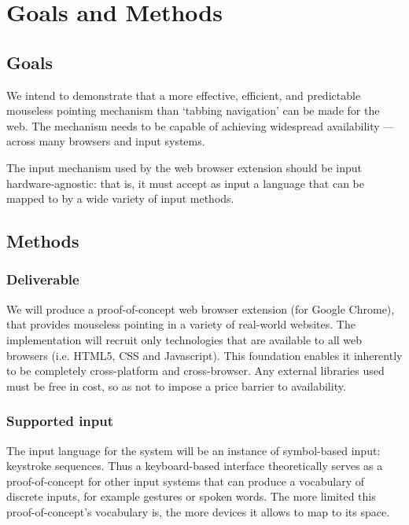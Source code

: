 \documentclass[a4paper, 12pt]{report}
\begin{document}
\section{Goals and Methods}
\subsection{Goals}
We intend to demonstrate that a more effective, efficient, and predictable mouseless pointing mechanism than `tabbing navigation' can be made for the web. The mechanism needs to be capable of achieving widespread availability --- across many browsers and input systems.

The input mechanism used by the web browser extension should be input hardware-agnostic: that is, it must accept as input a language that can be mapped to by a wide variety of input methods.

\subsection{Methods}
\subsubsection{Deliverable}
We will produce a proof-of-concept web browser extension (for Google Chrome), that provides mouseless pointing in a variety of real-world websites. The implementation will recruit only technologies that are available to all web browsers (i.e. HTML5, CSS and Javascript). This foundation enables it inherently to be completely cross-platform and cross-browser. Any external libraries used must be free in cost, so as not to impose a price barrier to availability.

\subsubsection{Supported input}
The input language for the system will be an instance of symbol-based input: keystroke sequences. Thus a keyboard-based interface theoretically serves as a proof-of-concept for other input systems that can produce a vocabulary of discrete inputs, for example gestures or spoken words. The more limited this proof-of-concept's vocabulary is, the more devices it allows to map to its space.
\end{document}
